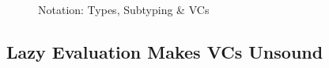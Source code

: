\begin{figure}
$$%
\caption{Notation: Types, Subtyping \& VCs}
\label{fig:overview:syntax}
\end{figure}

\subsection{Lazy Evaluation Makes VCs Unsound} \label{sec:overview:unsound}

